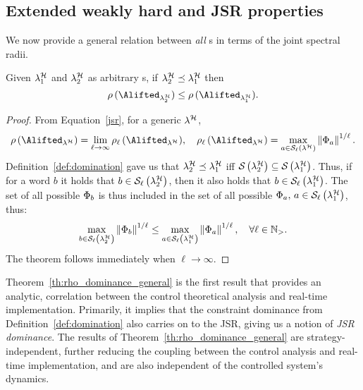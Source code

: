 \subsection{Extended weakly hard and JSR properties}
\label{sec:analytic_results}
We now provide a general relation between \emph{all} \ewhc{}s in terms of the joint spectral radii.
%
\begin{theorem}
    \label{th:rho_dominance_general}
    Given $\lambda_1^{\mathcal{H}}$ and $\lambda_2^{\mathcal{H}}$ as arbitrary \ewhc{}s, if $\lambda_2^{\mathcal{H}} \preceq \lambda_1^{\mathcal{H}}$ then
    $$
        \rho\,(\Alifted_{\lambda_2^\strat}) \leq \rho\,(\Alifted_{\lambda_1^\strat}).
    $$
%
    \begin{proof}
        From Equation~\eqref{jsr}, for a generic \ewhc{} $\lambda^{\mathcal{H}}$,
        \begin{equation*}
            \rho\,(\Alifted_{\lambda^\strat}) = \lim_{\ell\rightarrow \infty} \rho_\ell \,(\Alifted_{\lambda^\strat}), \quad 
            \rho_\ell\,(\Alifted_{\lambda^\strat}) = \max_{a \in \sset{\ell}{\lambda^\strat}}\norm{\clmat_{a}}^{1/\ell}.
        \end{equation*}
        Definition~\ref{def:domination} gave us that $\lambda^{\mathcal{H}}_2 \preceq \lambda^{\mathcal{H}}_1$ iff $\mathcal{S}_{}\left( \lambda^{\mathcal{H}}_2 \right) \subseteq \mathcal{S}_{}\left( \lambda^{\mathcal{H}}_1 \right)$.
        Thus, if for a word $b$ it holds that $b \in \mathcal{S}_{\ell}\left( \lambda^{\mathcal{H}}_2 \right)$, then it also holds that $b \in \mathcal{S}_{\ell}\left( \lambda^{\mathcal{H}}_1 \right)$.
        The set of all possible $\Phi_{b}$ is thus included in the set of all possible $\Phi_{a},\, a \in \mathcal{S}_{\ell}\left( \lambda^{\mathcal{H}}_1 \right)$, thus:
        \begin{equation*}
            \max_{b \in \mathcal{S}_{\ell}\left( \lambda^{\mathcal{H}}_2 \right)}\left\lVert\Phi_{b}\right\rVert^{1/\ell} \leq
            \max_{a \in \mathcal{S}_{\ell}\left( \lambda^{\mathcal{H}}_1 \right)}\left\lVert\Phi_{a}\right\rVert^{1/\ell}, \quad \forall \ell \in \mathbb{N}_{>}.
        \end{equation*}
        The theorem follows immediately when $\ell\rightarrow \infty$.
    \end{proof}
\end{theorem}
%
Theorem~\ref{th:rho_dominance_general} is the first result that provides an analytic, correlation between the control theoretical analysis and real-time implementation.
Primarily, it implies that the constraint dominance from Definition~\ref{def:domination} also carries on to the JSR, giving us a notion of \emph{JSR dominance}.
The results of Theorem~\ref{th:rho_dominance_general} are strategy-independent, further reducing the coupling between the control analysis and real-time implementation, and are also independent of the controlled system's dynamics.

